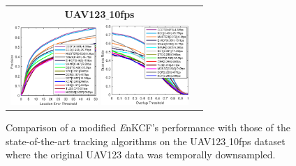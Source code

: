 \documentclass[10pt,twocolumn,letterpaper]{article}
\begin{document}
\begin{figure}[!h]
\centering
\begin{tabular}{cc}
\tiny\quad\textbf{UAV123$\_$10fps}\\
\includegraphics[width=3.32cm]{./figures/pr_uav123_10fps.eps}
\includegraphics[width=3.30cm]{./figures/sr_uav123_10fps.eps}\\
\end{tabular}
\caption{Comparison of a modified {\it E}nKCF's performance with those
  of the state-of-the-art tracking algorithms on the UAV123$\_$10fps
  dataset where the original UAV123 data was temporally downsampled.}
\label{fig:UAV123_10fpsDATASET}
\end{figure}
\end{document}
